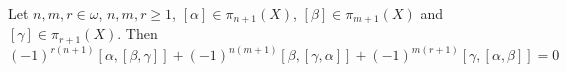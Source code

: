 \begin{proposition}
	Let $n,m,r \in \omega$, $n,m,r \geq 1$, $[\alpha] \in \pi_{n + 1}(X)$, $[\beta] \in \pi_{m + 1}(X)$ and $[\gamma] \in \pi_{r + 1}(X)$. Then
	\begin{equation*}
		(-1)^{r(n + 1)}[\alpha,[\beta,\gamma]] + (-1)^{n(m + 1)}[\beta,[\gamma,\alpha]] + (-1)^{m(r + 1)}[\gamma,[\alpha,\beta]] = 0
	\end{equation*}
\end{proposition}

\printbibliography


